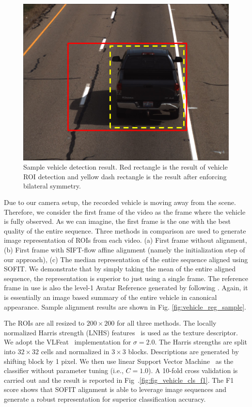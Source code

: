 \documentclass[10pt,journal]{IEEEtran}
\begin{document}
\begin{figure}[htbp]
	\centering
		\includegraphics[width=.9\columnwidth]{fig/vehicle_raw_data.png}
	\caption{Sample vehicle detection result. Red rectangle is the result of vehicle ROI detection and yellow dash rectangle is the result after enforcing bilateral symmetry.}
	\label{fig:vehicle_raw_data}
\end{figure}

Due to our camera setup, the recorded vehicle is moving away from the scene. Therefore, we consider the first frame of the video as the frame where the vehicle is fully observed. As we can imagine, the first frame is the one with the best quality of the entire sequence. Three methods in comparison are used to generate image representation of ROIs from each video. (a) First frame without alignment, (b) First frame with SIFT-flow affine alignment (namely the initialization step of our approach), (c) The median representation of the entire sequence aligned using SOFIT. We demonstrate that by simply taking the mean of the entire aligned sequence, the representation is superior to just using a single frame. The reference frame in use is also the level-1 Avatar Reference generated by following \cite{Yang_SMCB12}. Again, it is essentially an image based summary of the entire vehicle in canonical appearance. Sample alignment results are shown in Fig. \ref{fig:vehicle_reg_sample}.

The ROIs are all resized to $200\times200$ for all three methods. The locally normalized Harris strength (LNHS) features~\cite{Pearce11} is used as the texture descriptor. We adopt the VLFeat~\cite{vlfeat} implementation for $\sigma=2.0$. The Harris strengths are split into $32\times32$ cells and normalized in $3\times3$ blocks. Descriptions are generated by shifting block by 1 pixel. We then use linear Support Vector Machine~\cite{sklearn} as the classifier without parameter tuning (i.e., $C=1.0$). A 10-fold cross validation is carried out and the result is reported in Fig~.\ref{fig:fig_vehicle_cls_f1}. The F1 score shows that SOFIT alignment is able to leverage image sequences and generate a robust representation for superior classification accuracy. 
\end{document}
